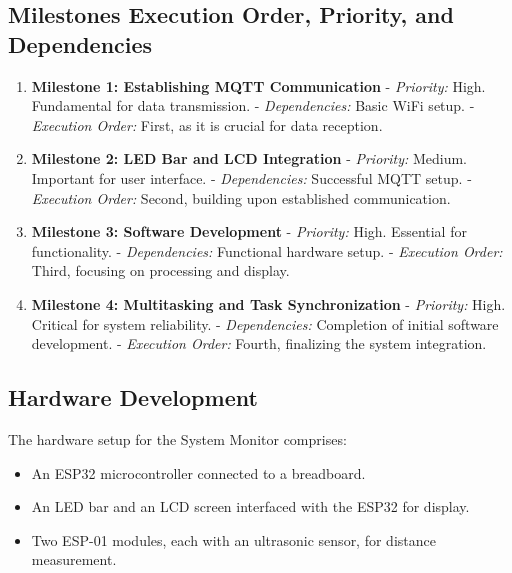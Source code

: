 \documentclass{article}
\begin{document}
\subsection{Milestones Execution Order, Priority, and Dependencies}
\begin{enumerate}
    \item \textbf{Milestone 1: Establishing MQTT Communication}
       - \textit{Priority:} High. Fundamental for data transmission.
       - \textit{Dependencies:} Basic WiFi setup.
       - \textit{Execution Order:} First, as it is crucial for data reception.

    \item \textbf{Milestone 2: LED Bar and LCD Integration}
       - \textit{Priority:} Medium. Important for user interface.
       - \textit{Dependencies:} Successful MQTT setup.
       - \textit{Execution Order:} Second, building upon established communication.

    \item \textbf{Milestone 3: Software Development}
       - \textit{Priority:} High. Essential for functionality.
       - \textit{Dependencies:} Functional hardware setup.
       - \textit{Execution Order:} Third, focusing on processing and display.

    \item \textbf{Milestone 4: Multitasking and Task Synchronization}
       - \textit{Priority:} High. Critical for system reliability.
       - \textit{Dependencies:} Completion of initial software development.
       - \textit{Execution Order:} Fourth, finalizing the system integration.
\end{enumerate}

\subsection{Hardware Development}
The hardware setup for the System Monitor comprises:
\begin{itemize}
    \item An ESP32 microcontroller connected to a breadboard.
    \item An LED bar and an LCD screen interfaced with the ESP32 for display.
    \item Two ESP-01 modules, each with an ultrasonic sensor, for distance measurement.
\end{itemize}
\end{document}
